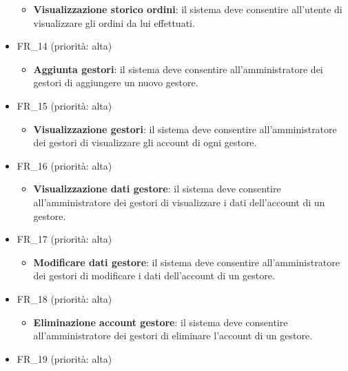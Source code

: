 \documentclass[12pt, a4paper, oneside]{book}
\begin{document}
\begin{itemize}
               \begin{itemize}
                   \item \textbf{Visualizzazione storico ordini}: il sistema deve consentire all'utente di visualizzare gli ordini da lui effettuati.
                \end{itemize}
            \item FR\_14 (priorità: alta)
               \begin{itemize}
                   \item \textbf{Aggiunta gestori}: il sistema deve consentire all'amministratore dei gestori di aggiungere un nuovo gestore.
                \end{itemize}
            \item FR\_15 (priorità: alta)
               \begin{itemize}
                   \item \textbf{Visualizzazione gestori}: il sistema deve consentire all'amministratore dei gestori di visualizzare gli account di ogni gestore.
                \end{itemize}
            \item FR\_16 (priorità: alta)
               \begin{itemize}
                   \item \textbf{Visualizzazione dati gestore}: il sistema deve consentire all'amministratore dei gestori di visualizzare i dati dell'account di un gestore.
                \end{itemize}
            \item FR\_17 (priorità: alta)
               \begin{itemize}
                   \item \textbf{Modificare dati gestore}: il sistema deve consentire all'amministratore dei gestori di modificare i dati dell'account di un gestore.
                \end{itemize}
            \item FR\_18 (priorità: alta)
               \begin{itemize}
                   \item \textbf{Eliminazione account gestore}: il sistema deve consentire all'amministratore dei gestori di eliminare l'account di un gestore.
                \end{itemize}
            \item FR\_19 (priorità: alta)
               \begin{itemize}

\end{itemize}
\end{itemize}
\end{document}

